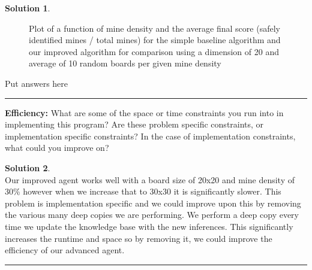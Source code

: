 \documentclass{article}
\theoremstyle{definition}
\def\fline{\rule{0.75\linewidth}{0.5pt}}
\newcommand{\finishline}{\vspace{-15pt}\begin{center}\fline\end{center}}
\newtheorem*{solution*}{Solution}
\newenvironment{solution}{\begin{solution*}}{{\finishline} \end{solution*}}
\begin{document}
\begin{solution}

    \begin{figure}[h]
	\centering
	\caption{Plot of a function of mine density and the average final score (safely identified mines / total mines) for the simple baseline algorithm and our improved algorithm for comparison using a dimension of 20 and average of 10 random boards per given mine density}
	\end{figure}
	
    Put answers here
	
\end{solution}

\smallskip

\textbf{Efficiency: }
What are some of the space or time constraints you run into in implementing this program? 
Are these problem specific constraints, or implementation specific constraints? 
In the case of implementation constraints, what could you improve on?


\smallskip

\begin{solution} \hfil \\
    Our improved agent works well with a board size of 20x20 and mine density of 30\% however when we increase that to 30x30 it is significantly slower.
    This problem is implementation specific and we could improve upon this by removing the various many deep copies we are performing. We perform a deep copy every time we update the knowledge base with the new inferences. This significantly increases the runtime and space so by removing it, we could improve the efficiency of our advanced agent.
\end{solution}
\end{document}
